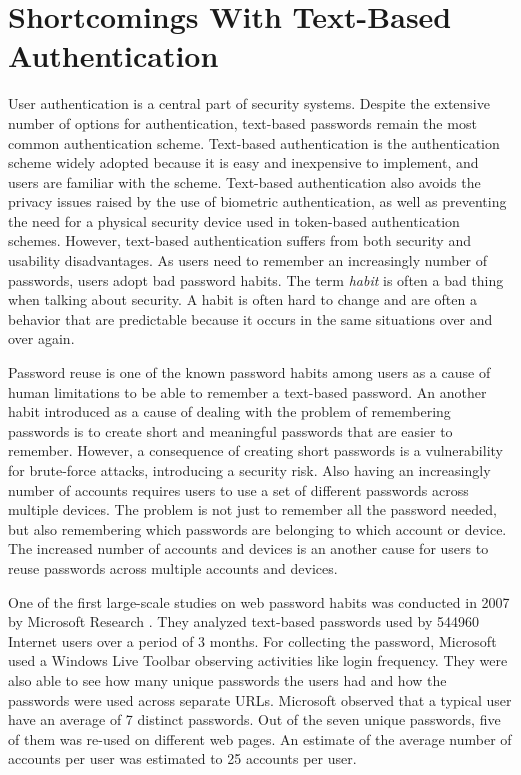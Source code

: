 \section{Shortcomings With Text-Based Authentication} \label{sec:shortcomings}

  User authentication is a central part of security systems. Despite the extensive number of options for authentication, text-based passwords remain the most common authentication scheme. Text-based authentication is the authentication scheme widely adopted because it is easy and inexpensive to implement, and users are familiar with the scheme. Text-based authentication also avoids the privacy issues raised by the use of biometric authentication, as well as preventing the need for a physical security device used in token-based authentication schemes. However, text-based authentication suffers from both security and usability disadvantages. As users need to remember an increasingly number of passwords, users adopt bad password habits. The term {\it habit} is often a bad thing when talking about security. A habit is often hard to change and are often a behavior that are predictable because it occurs in the same situations over and over again. 

  Password reuse is one of the known password habits among users as a cause of human limitations to be able to remember a text-based password. An another habit introduced as a cause of dealing with the problem of remembering passwords is to create short and meaningful passwords that are easier to remember. However, a consequence of creating short passwords is a vulnerability for brute-force attacks, introducing a security risk. Also having an increasingly number of accounts requires users to use a set of different passwords across multiple devices. The problem is not just to remember all the password needed, but also remembering which passwords are belonging to which account or device. The increased number of accounts and devices is an another cause for users to reuse passwords across multiple accounts and devices.

  One of the first large-scale studies on web password habits was conducted in 2007 by Microsoft Research \cite{habits1}. They analyzed text-based passwords used by 544960 Internet users over a period of 3 months. For collecting the password, Microsoft used a Windows Live Toolbar observing activities like login frequency. They were also able to see how many unique passwords the users had and how the passwords were used across separate URLs. Microsoft observed that a typical user have an average of 7 distinct passwords. Out of the seven unique passwords, five of them was re-used on different web pages. An estimate of the average number of accounts per user was estimated to 25 accounts per user.

